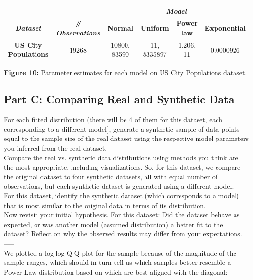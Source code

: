 \vspace{4pt}

\begin{center}
\begin{tabular}{|c|c|c|c|c|c|}
\hline
& & \multicolumn{4}{c|}{{\bf{\em{Model}}}}\\
\hline
{{\bf{\em{Dataset}}}} & {\bf{\em{\# Observations}}} &\textbf{Normal}& \textbf{Uniform} & \textbf{Power law} & \textbf{Exponential} \\
\hline
\textbf{US City Populations} & 19268 & 10800, 83590 & 11, 8335897 & 1.206, 11 & 0.0000926 \\
\hline
\end{tabular}
\end{center}

\begin{center}
\textbf{Figure 10:} Parameter estimates for each model on US City Populations dataset.
\end{center}
\newpage

\subsection{Part C: Comparing Real and Synthetic Data}

For each fitted distribution (there will be 4 of them for this dataset, each corresponding to a different model), generate a synthetic sample of data points equal to the sample size of the real dataset using the respective model parameters you inferred from the real dataset.\\

Compare the real vs. synthetic data distributions using methods you think are the most appropriate, including visualizations. So, for this dataset, we compare the original dataset to four synthetic datasets, all with equal number of observations, but each synthetic dataset is generated using a different model.\\

For this dataset, identify the synthetic dataset (which corresponds to a model) that is most similar to the original data in terms of its distribution.\\

Now revisit your initial hypothesis. For this dataset: Did the dataset behave as expected, or was another model (assumed distribution) a better fit to the dataset? Reflect on why the observed results may differ from your expectations.\\
-----\\
We plotted a log-log Q-Q plot for the sample because of the magnitude of the sample ranges, which should in turn tell us which samples better resemble a Power Law distribution based on which are best aligned with the diagonal:

